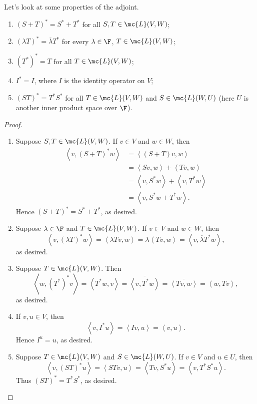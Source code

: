 \documentclass[math0540-lecture-notes.tex]{subfiles}
\begin{document}
Let's look at some properties of the adjoint.
\begin{proposition}{}
  \begin{enumerate}
    \item $(S+T)^*=S^*+T^*$ for all $S,T\in \mc{L}(V,W)$;
    \item $\left( \lambda T \right)^*=\overline{\lambda}T^* $ for every $\lambda\in \F$, $T\in
      \mc{L}(V,W)$;
    \item $(T^*)^*=T$ for all $T\in \mc{L}(V,W)$;
    \item $I^*=I$, where $I$ is the identity operator on $V$;
    \item $(ST)^*=T^*S^*$ for all $T\in \mc{L}(V,W)$ and $S\in \mc{L}(W,U)$ (here $U$ is another
      inner product space over $\F$).
  \end{enumerate}
\end{proposition}
\begin{proof}[Proof]
  \begin{enumerate}
    \item Suppose $S,T\in \mc{L}(V,W)$. If $v\in V$ and $w\in W$, then
      \begin{align*}
        \left<v,(S+T)^*w \right> &= \left<(S+T)v,w \right>  \\
                                 &= \left<Sv,w \right>+\left<Tv,w \right>   \\
                                 &= \left<v,S^*w \right> +\left<v,T^*w \right>  \\
                                 &=\left<v,S^*w+T^*w \right>  
       .\end{align*} Hence $(S+T)^*=S^*+T^*$, as desired.
     \item Suppose $\lambda\in \F$ and $T\in \mc{L}(V,W)$. If $v\in V$ and $w\in W$, then \[
           \left<v,(\lambda T)^*w \right> =\left<\lambda Tv,w \right> =\lambda\left<Tv,w \right>
           =\left<v,\overline{\lambda} T^*w\right> 
       ,\] as desired.
     \item Suppose $T\in \mc{L}(V,W)$. Then \[
           \left<w,(T^*)^*v \right> =\left<T^*w,v \right> =\overline{\left<v,T^*w
           \right>}=\overline{\left<Tv,w \right> }=\left<w,Tv \right> 
       ,\] as desired.
     \item If $v,u\in V$, then \[
       \left< v,I^*u \right> =\left<Iv,u \right> =\left<v,u \right> 
     .\] Hence $I^u=u$, as desired.
   \item Suppose $T\in \mc{L}(V,W)$ and $S\in \mc{L}(W,U)$. If $v\in V$ and $u\in U$, then \[
       \left<v,(ST)^*u \right> =\left<STv,u \right> =\left<Tv,S^*u \right> =\left<v,T^*S^*u \right> 
     .\] Thus $(ST)^*=T^*S^*$, as desired.
  \end{enumerate}
\end{proof}
\end{document}

